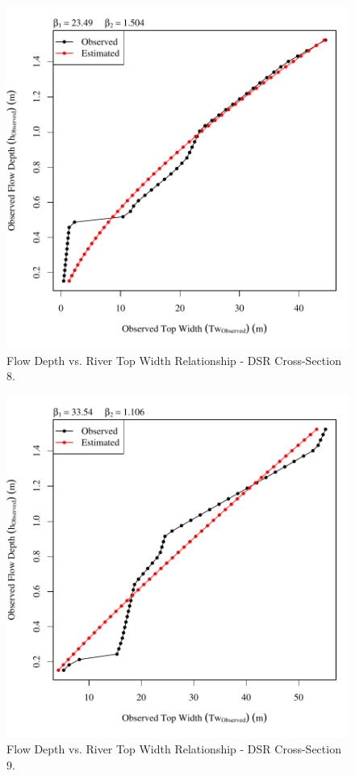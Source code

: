 \begin{center}
\begin{figure}[htbp]
	\includegraphics[width=6in]{"Figures/Results_DSR/Survey Tw vs H-Section 8"}
	\caption{Flow Depth vs. River Top Width Relationship - DSR Cross-Section 8.}
\end{figure}
\end{center}
\newpage

\begin{center}
\begin{figure}[htbp]
	\includegraphics[width=6in]{"Figures/Results_DSR/Survey Tw vs H-Section 9"}
	\caption{Flow Depth vs. River Top Width Relationship - DSR Cross-Section 9.}
\end{figure}
\end{center}
\newpage

